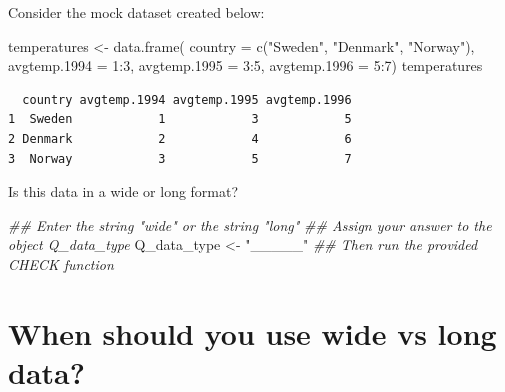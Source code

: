 \documentclass[
  letterpaper,
  DIV=11,
  numbers=noendperiod]{scrreprt}
\newenvironment{Shaded}{\begin{snugshade}}{\end{snugshade}}
\newcommand{\AttributeTok}[1]{\textcolor[rgb]{0.40,0.45,0.13}{#1}}
\newcommand{\DecValTok}[1]{\textcolor[rgb]{0.68,0.00,0.00}{#1}}
\newcommand{\DocumentationTok}[1]{\textcolor[rgb]{0.37,0.37,0.37}{\textit{#1}}}
\newcommand{\FunctionTok}[1]{\textcolor[rgb]{0.28,0.35,0.67}{#1}}
\newcommand{\NormalTok}[1]{\textcolor[rgb]{0.00,0.23,0.31}{#1}}
\newcommand{\OtherTok}[1]{\textcolor[rgb]{0.00,0.23,0.31}{#1}}
\newcommand{\SpecialCharTok}[1]{\textcolor[rgb]{0.37,0.37,0.37}{#1}}
\newcommand{\StringTok}[1]{\textcolor[rgb]{0.13,0.47,0.30}{#1}}
\begin{document}
\begin{tcolorbox}[enhanced jigsaw, titlerule=0mm, colback=white, left=2mm, breakable, opacitybacktitle=0.6, colbacktitle=quarto-callout-tip-color!10!white, colframe=quarto-callout-tip-color-frame, bottomtitle=1mm, opacityback=0, coltitle=black, arc=.35mm, toptitle=1mm, title=\textcolor{quarto-callout-tip-color}{\faLightbulb}\hspace{0.5em}{Practice}, leftrule=.75mm, toprule=.15mm, bottomrule=.15mm, rightrule=.15mm]

Consider the mock dataset created below:

\begin{Shaded}
\begin{Highlighting}[]
\NormalTok{temperatures }\OtherTok{\textless{}{-}} 
  \FunctionTok{data.frame}\NormalTok{(}
    \AttributeTok{country =} \FunctionTok{c}\NormalTok{(}\StringTok{"Sweden"}\NormalTok{, }\StringTok{"Denmark"}\NormalTok{, }\StringTok{"Norway"}\NormalTok{),}
    \AttributeTok{avgtemp.1994 =} \DecValTok{1}\SpecialCharTok{:}\DecValTok{3}\NormalTok{,}
    \AttributeTok{avgtemp.1995 =} \DecValTok{3}\SpecialCharTok{:}\DecValTok{5}\NormalTok{,}
    \AttributeTok{avgtemp.1996 =} \DecValTok{5}\SpecialCharTok{:}\DecValTok{7}\NormalTok{)}
\NormalTok{temperatures}
\end{Highlighting}
\end{Shaded}

\begin{verbatim}
  country avgtemp.1994 avgtemp.1995 avgtemp.1996
1  Sweden            1            3            5
2 Denmark            2            4            6
3  Norway            3            5            7
\end{verbatim}

Is this data in a wide or long format?

\begin{Shaded}
\begin{Highlighting}[]
\DocumentationTok{\#\# Enter the string "wide" or the string "long"}
\DocumentationTok{\#\# Assign your answer to the object Q\_data\_type}
\NormalTok{Q\_data\_type }\OtherTok{\textless{}{-}} \StringTok{"\_\_\_\_\_"}
\DocumentationTok{\#\# Then run the provided CHECK function}
\end{Highlighting}
\end{Shaded}

\end{tcolorbox}

\section{When should you use wide vs long
data?}\label{when-should-you-use-wide-vs-long-data}
\end{document}

